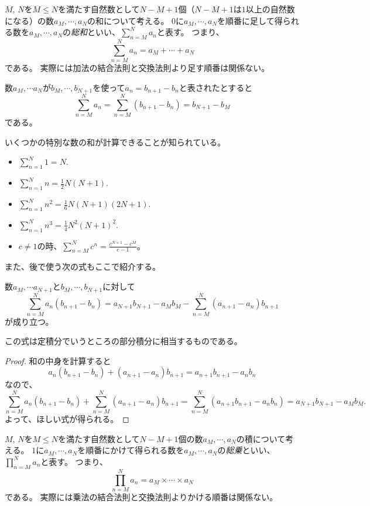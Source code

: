 $M$, $N$を$M \le N$を満たす自然数として$N-M+1$個（$N-M+1$は$1$以上の自然数になる）の数$a_M, \cdots, a_N$の和について考える。
$0$に$a_M, \cdots, a_N$を順番に足して得られる数を$a_M, \cdots, a_N$の\emph{総和}といい、$\sum_{n = M}^N a_n$と表す。
つまり、
$$
\sum_{n = M}^N a_n = a_M+\cdots+a_N
$$
である。
実際には加法の結合法則と交換法則より足す順番は関係ない。

\begin{proposition}
数$a_M, \cdots a_N$が$b_M, \cdots, b_{N+1}$を使って$a_n = b_{n+1}-b_n$と表されたとすると
$$
\sum_{n = M}^N a_n = \sum_{n = M}^N(b_{n+1}-b_n) = b_{N+1}-b_M
$$
である。
\end{proposition}

いくつかの特別な数の和が計算できることが知られている。

\begin{proposition}[和の公式]
\begin{itemize}
\item
$\sum_{n = 1}^N 1 = N$.
\item
$\sum_{n = 1}^N n = \frac{1}{2}N(N+1)$.
\item
$\sum_{n = 1}^N n^2 = \frac{1}{6}N(N+1)(2 N+1)$.
\item
$\sum_{n = 1}^N n^3 = \frac{1}{4}N^2(N+1)^2$.
\item
$c \ne 1$の時、$\sum_{n = M}^N c^n = \frac{c^{N+1}-c^M}{c-1}$。
\end{itemize}
\end{proposition}

また、後で使う次の式もここで紹介する。

\begin{proposition}[部分和分]
\label{t_sum_part}
数$a_M, \cdots a_{N+1}$と$b_M, \cdots, b_{N+1}$に対して
$$
\sum_{n = M}^N a_n(b_{n+1}-b_n) = a_{N+1}b_{N+1}-a_M b_M-\sum_{n = M}^N (a_{n+1}-a_n)b_{n+1}
$$
が成り立つ。
\end{proposition}

この式は定積分でいうところの部分積分に相当するものである。

\begin{proof}
和の中身を計算すると
$$
a_n(b_{n+1}-b_n)+(a_{n+1}-a_n)b_{n+1} = a_{n+1}b_{n+1}-a_n b_n
$$
なので、
$$
\sum_{n = M}^N a_n(b_{n+1}-b_n)+\sum_{n = M}^N (a_{n+1}-a_n)b_{n+1} = \sum_{n = M}^N (a_{n+1}b_{n+1}-a_n b_n) = a_{N+1}b_{N+1}-a_M b_M.
$$
よって、ほしい式が得られる。
\end{proof}

$M$, $N$を$M \le N$を満たす自然数として$N-M+1$個の数$a_M, \cdots, a_N$の積について考える。
$1$に$a_M, \cdots, a_N$を順番にかけて得られる数を$a_M, \cdots, a_N$の\emph{総乗}といい、$\prod_{n = M}^N a_n$と表す。
つまり、
$$
\prod_{n = M}^N a_n = a_M\times\cdots\times a_N
$$
である。
実際には乗法の結合法則と交換法則よりかける順番は関係ない。

